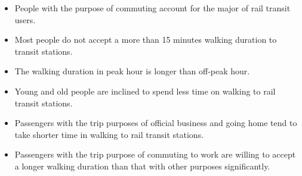 %
\begin{itemize}
	\setlength{\parskip}{0\baselineskip} %
	\item People with the purpose of commuting account for the major of rail transit users.
	\item Most people do not accept a more than 15 minutes walking duration to transit stations.
	\item The walking duration in peak hour is longer than off-peak hour.
	\item Young and old people are inclined to spend less time on walking to rail transit stations.
	\item Passengers with the trip purposes of official business and going home tend to take shorter time in walking to rail transit stations.
	\item Passengers with the trip purpose of commuting to work are willing to accept a longer walking duration than that with other purposes significantly.
	\setlength{\parskip}{0.7\baselineskip} %
\end{itemize}


